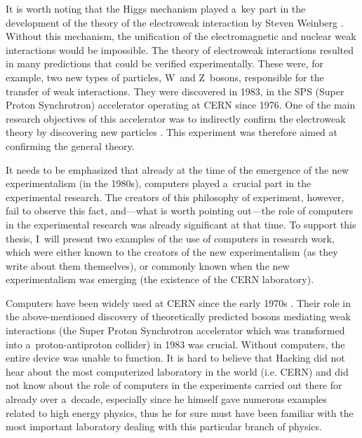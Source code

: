 It is worth noting that the Higgs mechanism played a~key part in the development of the theory of the electroweak interaction by Steven Weinberg 
\parencite*[][]{weinberg_model_1967}. %
 Without this mechanism, the unification of the electromagnetic and nuclear weak interactions would be impossible. The theory of electroweak interactions resulted in many predictions that could be verified experimentally. These were, for example, two new types of particles, W~and Z~bosons, responsible for the transfer of weak interactions. They were discovered in 1983, in the SPS (Super Proton Synchrotron) accelerator operating at CERN since 1976. One of the main research objectives of this accelerator was to indirectly confirm the electroweak theory by discovering new particles 
\parencite[][]{weinberg_dreams_1992}. %
 This experiment was therefore aimed at confirming the general theory.



It needs to be emphasized that already at the time of the emergence of the new experimentalism (in the 1980s), computers played a~crucial part in the experimental research. The creators of this philosophy of experiment, however, fail to observe this fact, and---what is worth pointing out---the role of computers in the experimental research was already significant at that time. To support this thesis, I~will present two examples of the use of computers in research work, which were either known to the creators of the new experimentalism (as they write about them themselves), or commonly known when the new experimentalism was emerging (the existence of the CERN laboratory).



Computers have been widely used at CERN since the early 1970s 
\parencite[][]{crowley-milling_computer_1974}. %
 Their role in the above-mentioned discovery of theoretically predicted bosons mediating weak interactions (the Super Proton Synchrotron accelerator which was transformed into a~proton-antiproton collider) in 1983 was crucial. Without computers, the entire device was unable to function. It is hard to believe that Hacking did not hear about the most computerized laboratory in the world (i.e. CERN) and did not know about the role of computers in the experiments carried out there for already over a~decade, especially since he himself gave numerous examples related to high energy physics, thus he for sure must have been familiar with the most important laboratory dealing with this particular branch of physics.



